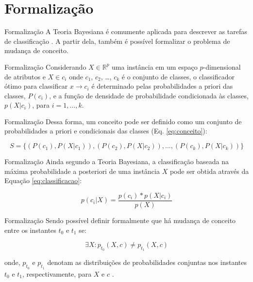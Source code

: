 \documentclass[10pt]{beamer}
\begin{document}
\section{Formalização}

\begin{frame}{Formalização}
    A Teoria Bayesiana é comumente aplicada para descrever as tarefas de classificação \cite{Duda:2000:PC:954544}.
    A partir dela, também é possível formalizar o problema de mudança de conceito.
\end{frame}


\begin{frame}{Formalização}
    Considerando $X \in \mathbb{R}^p$ uma instância em um espaço $p$-dimensional de atributos e $X \in c_i$ onde $c_1$, $c_2$, \ldots, $c_k$ é o conjunto de classes, 
    o classificador ótimo para classificar $x \rightarrow c_i$ é determinado pelas probabilidades a priori das classes, $P(c_i)$, e a função de densidade de probabilidade condicionada às classes, $p(X|c_i)$, para $i = 1, \ldots, k$.
\end{frame}

\begin{frame}{Formalização}
Dessa forma, um conceito pode ser definido como um conjunto de probabilidades a priori e condicionais das classes (Eq. \ref{eq:conceito}):

\begin{equation} \label{eq:conceito}
    S = \{(P(c_1), P(X|c_1)), (P(c_2), P(X|c_2)), ..., (P(c_k), P(X|c_k))\}
\end{equation}
\end{frame}

\begin{frame}{Formalização}
Ainda segundo a Teoria Bayesiana, a classificação baseada na máxima probabilidade a posteriori de uma instância $X$ pode ser obtida através da Equação \ref{eq:classificacao}:

\begin{equation} \label{eq:classificacao}
    p(c_i|X) = \frac{p(c_i) * p(X|c_i)}{p(X)}
\end{equation}
\end{frame}

\begin{frame}{Formalização}
Sendo possível definir formalmente que há mudança de conceito entre os instantes $t_0$ e $t_1$ se:

\begin{equation} \label{eq:3}
    {\exists}X : p_{t_0}(X, c) \ne p_{t_1}(X, c)
\end{equation}

onde, $p_{t_0}$ e $p_{t_1}$ denotam as distribuições de probabilidades conjuntas nos instantes $t_0$ e $t_1$, respectivamente, 
para $X$ e $c$ \cite{Gama:2014:SCD:2597757.2523813}. 
\end{frame}
\end{document}
